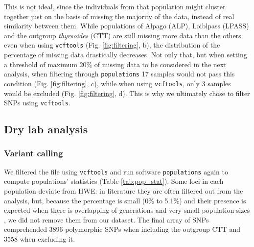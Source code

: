 \documentclass[a4paper, 12pt]{report}
\begin{document}
 This is not ideal, since the individuals from that population might cluster together just on the basis of missing the majority of the data, instead of real similarity between them. While populations of Alpago (ALP), Loiblpass (LPASS) and the outgroup \textit{thyrsoides} (CTT) are still missing more data than the others even when using \texttt{vcftools} (Fig. \ref{fig:filtering}, b), the distribution of the percentage of missing data drastically decreases. Not only that, but when setting a threshold of maximum 20\% of missing data to be considered in the next analysis, when filtering through \texttt{populations} 17 samples would not pass this condition  (Fig. \ref{fig:filtering}, c), while when using \texttt{vcftools}, only 3 samples would be excluded  (Fig. \ref{fig:filtering}, d). This is why we ultimately chose to filter SNPs using \texttt{vcftools}. 
 
\subsection{Dry lab analysis}
\subsubsection{Variant calling}
\vspace{-1em}
We filtered the file using \texttt{vcftools} and run software \texttt{populations} again to compute populations' statistics (Table \ref{tab:pop_stat}). Some loci in each population deviate from HWE: in literature they are often filtered out from the analysis, but, because the percentage is small (0\% to 5.1\%) and their presence is expected when there is overlapping of generations and very small population sizes \parencite{pearmanCommonlyUsedHardy2022}, we did not remove them from our dataset. The final array of SNPs comprehended 3896 polymorphic SNPs when including the outgroup CTT and 3558 when excluding it.
\end{document}
